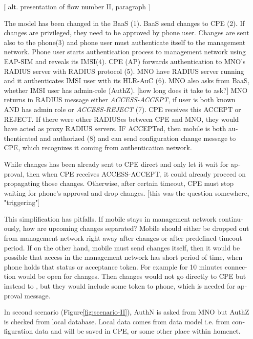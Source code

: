 \documentclass[12pt,a4paper,english]{tutthesis}
\begin{document}
\begin{otherlanguage}{english}
[ alt. presentation of flow number II, paragraph ] 

The model has been changed in the BaaS (1). BaaS send changes to CPE
(2).  If changes are privileged, they need to be approved by phone
user.  Changes are sent also to the phone(3) and phone user must
authenticate itself to the management network.  Phone user starts
authentication process to management network using EAP-SIM and reveals
its IMSI(4).  CPE (AP) forwards authentication to MNO's RADIUS server
with RADIUS protocol (5).  MNO have RADIUS server running and it
authenticates IMSI user with its HLR-AuC (6).  MNO also asks from
BaaS, whether IMSI user has admin-role (AuthZ). [how long does it take
to ask?]  MNO returns in RADIUS message either \emph{ACCESS-ACCEPT}, if
user is both known AND has admin role or \emph{ACCESS-REJECT} (7).  CPE
receives this ACCEPT or REJECT. If there were other RADIUSes between
CPE and MNO, they would have acted as proxy RADIUS servers.  IF
ACCEPTed, then mobile is both authenticated and authorized (8) and can
send configuration change message to CPE, which recognizes it coming
from authentication network.

While changes has been already sent to CPE direct and only let it
wait for approval, then when CPE receives ACCESS-ACCEPT, it could
already proceed on propagating those
changes.  Otherwise, after certain timeout, CPE must stop waiting
for phone's approval and drop changes. [this was the question
somewhere, "triggering"]


This simplification has pitfalls. If mobile stays in management
network continuously, how are upcoming changes separated? Mobile should
either be dropped out from management network right away after changes or
after predefined timeout period.  If on the other hand, mobile must
send changes itself, then it would be possible that access in the
management network has short period of time, when phone 
holds that status or acceptance token. For example for 10 minutes connection
would be open for changes. Then changes would not go directly to CPE
but instead to , but they would include some token to phone, which is
needed for approval message.


\label{scenario-ii}

In second scenario (Figure\ref{fig:scenario-II}), AuthN is asked from MNO but
AuthZ is checked from local database. Local data comes from data model
i.e. from configuration data and will be saved in CPE, or some other
place within homenet.



\end{otherlanguage}
\end{document}
